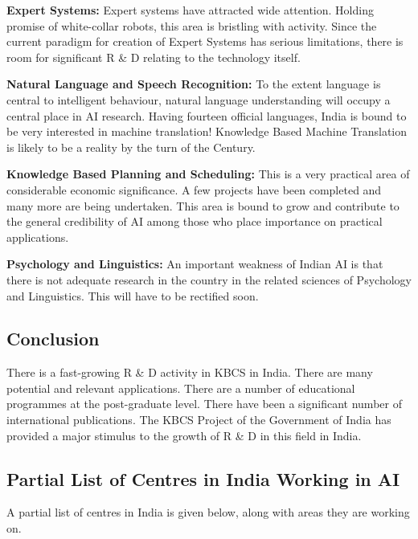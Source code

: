 {\bf Expert Systems:}
Expert systems have attracted wide attention.  Holding promise
of white-collar robots, this area is bristling with activity.
Since the current paradigm for creation of Expert Systems has
serious limitations, there is room for significant R \& D relating
to the technology itself.

{\bf Natural Language and Speech Recognition:}
To the extent language is central to intelligent behaviour,
natural language understanding will occupy a central place
in AI research.  Having fourteen official languages, India is bound to 
be very interested in machine translation!  Knowledge Based Machine
Translation is likely to be a reality by the turn of the Century.

{\bf Knowledge Based Planning and Scheduling:}
This is a very practical area of considerable economic significance.
A few projects have been completed and many more are being
undertaken.  This area is bound to grow and contribute to the general
credibility of AI among those who place importance on practical applications.

{\bf Psychology and Linguistics:}
An important weakness of Indian AI is that there is not adequate research
in the country in the related sciences of Psychology and
Linguistics.  This will have to be rectified soon.

\subsection{Conclusion}
There is a fast-growing R \& D activity in KBCS in India. There are
many potential and relevant applications. There are a number of 
educational programmes at the post-graduate level. There have been a 
significant number of international publications. The KBCS Project of 
the Government of India has provided a major stimulus to the growth 
of R \& D in this field in India. 

\subsection*{Partial List of Centres in India Working in AI}
A partial list of centres in India is given below,
along with areas they are working on.


